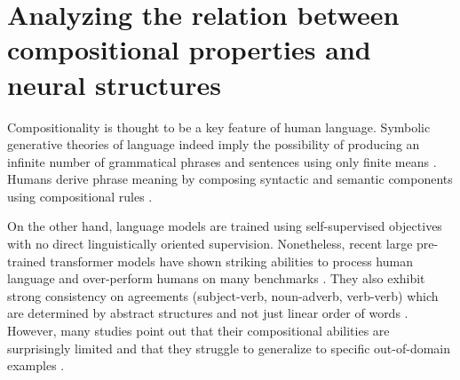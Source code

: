 \setchapterpreamble[u]{\margintoc}
\chapter{Analyzing the relation between compositional properties and neural structures}


Compositionality is thought to be a key feature of human language. Symbolic generative theories of language indeed imply the possibility of producing an infinite number of grammatical phrases and sentences using only finite means \parencite{chomsky_57, montague_70, hauser_02}. Humans derive phrase meaning by composing syntactic and semantic components using compositional rules \parencite{partee_84, cann_93, dowty_07}. %

On the other hand, language models are trained using self-supervised objectives with no direct linguistically oriented supervision. Nonetheless, recent large pre-trained transformer models have shown striking abilities to process human language and over-perform humans on many benchmarks \parencite{devlin_19, brown_20}. They also exhibit strong consistency on agreements (subject-verb, noun-adverb, verb-verb) which are determined by abstract structures and not just linear order of words \parencite{linzen_16, gulordava_18, marvin_18, newman_21}. However, many studies point out that their compositional abilities are surprisingly limited and that they struggle to generalize to specific out-of-domain examples \parencite{lake_18, kim_20, hupkes_20}. 

